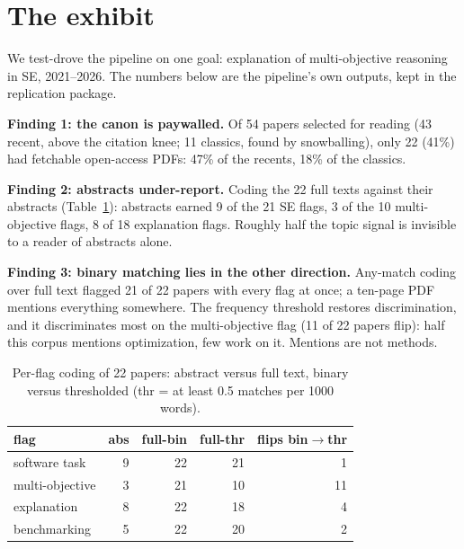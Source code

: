 \section{The exhibit}\label{sec:exhibit}

We test-drove the pipeline on one goal: explanation of multi-objective
reasoning in SE, 2021--2026.
The numbers below are the pipeline's own outputs, kept in the
replication package.

\textbf{Finding 1: the canon is paywalled.}
Of 54 papers selected for reading (43 recent, above the citation knee;
11 classics, found by snowballing), only 22 (41\%) had fetchable
open-access PDFs: 47\% of the recents, 18\% of the classics.

\textbf{Finding 2: abstracts under-report.}
Coding the 22 full texts against their abstracts
(Table~\ref{tab:flips}): abstracts earned 9 of the 21 SE flags, 3 of
the 10 multi-objective flags, 8 of 18 explanation flags.
Roughly half the topic signal is invisible to a reader of abstracts
alone.

\textbf{Finding 3: binary matching lies in the other direction.}
Any-match coding over full text flagged 21 of 22 papers with every
flag at once; a ten-page PDF mentions everything somewhere.
The frequency threshold restores discrimination, and it discriminates
most on the multi-objective flag (11 of 22 papers flip): half this
corpus mentions optimization, few work on it.
Mentions are not methods.

\begin{table}
\caption{Per-flag coding of 22 papers: abstract versus
full text, binary versus thresholded (thr = at least 0.5 matches per
1000 words).}
\label{tab:flips}
\small
\begin{tabular}{lrrrr}
\toprule
flag & abs & full-bin & full-thr & flips bin$\to$thr\\
\midrule
software task & 9 & 22 & 21 & 1\\
multi-objective & 3 & 21 & 10 & 11\\
explanation & 8 & 22 & 18 & 4\\
benchmarking & 5 & 22 & 20 & 2\\
\bottomrule
\end{tabular}
\end{table}
